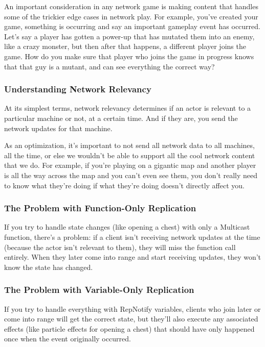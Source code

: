 \documentclass[
  letterpaper,
  DIV=11,
  numbers=noendperiod]{scrartcl}
\begin{document}
An important consideration in any network game is making content that
handles some of the trickier edge cases in network play. For example,
you've created your game, something is occurring and say an important
gameplay event has occurred. Let's say a player has gotten a power-up
that has mutated them into an enemy, like a crazy monster, but then
after that happens, a different player joins the game. How do you make
sure that player who joins the game in progress knows that that guy is a
mutant, and can see everything the correct way?

\subsubsection{Understanding Network
Relevancy}\label{understanding-network-relevancy}

At its simplest terms, network relevancy determines if an actor is
relevant to a particular machine or not, at a certain time. And if they
are, you send the network updates for that machine.

As an optimization, it's important to not send all network data to all
machines, all the time, or else we wouldn't be able to support all the
cool network content that we do. For example, if you're playing on a
gigantic map and another player is all the way across the map and you
can't even see them, you don't really need to know what they're doing if
what they're doing doesn't directly affect you.

\subsubsection{The Problem with Function-Only
Replication}\label{the-problem-with-function-only-replication}

If you try to handle state changes (like opening a chest) with only a
Multicast function, there's a problem: if a client isn't receiving
network updates at the time (because the actor isn't relevant to them),
they will miss the function call entirely. When they later come into
range and start receiving updates, they won't know the state has
changed.

\subsubsection{The Problem with Variable-Only
Replication}\label{the-problem-with-variable-only-replication}

If you try to handle everything with RepNotify variables, clients who
join later or come into range will get the correct state, but they'll
also execute any associated effects (like particle effects for opening a
chest) that should have only happened once when the event originally
occurred.
\end{document}
